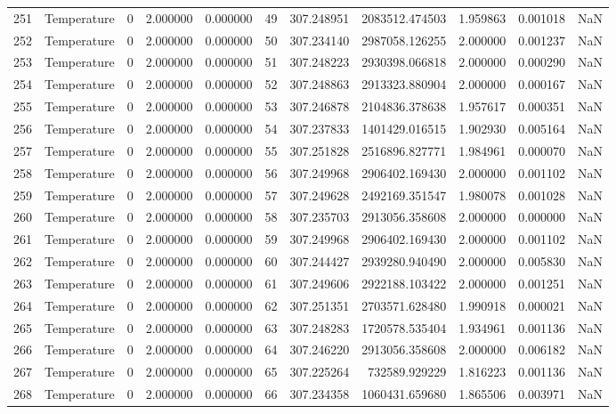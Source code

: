 \begin{tabular}{llrrrrrrrrr}
251 & Temperature & 0 & 2.000000 & 0.000000 & 49 & 307.248951 & 2083512.474503 & 1.959863 & 0.001018 & NaN \\
252 & Temperature & 0 & 2.000000 & 0.000000 & 50 & 307.234140 & 2987058.126255 & 2.000000 & 0.001237 & NaN \\
253 & Temperature & 0 & 2.000000 & 0.000000 & 51 & 307.248223 & 2930398.066818 & 2.000000 & 0.000290 & NaN \\
254 & Temperature & 0 & 2.000000 & 0.000000 & 52 & 307.248863 & 2913323.880904 & 2.000000 & 0.000167 & NaN \\
255 & Temperature & 0 & 2.000000 & 0.000000 & 53 & 307.246878 & 2104836.378638 & 1.957617 & 0.000351 & NaN \\
256 & Temperature & 0 & 2.000000 & 0.000000 & 54 & 307.237833 & 1401429.016515 & 1.902930 & 0.005164 & NaN \\
257 & Temperature & 0 & 2.000000 & 0.000000 & 55 & 307.251828 & 2516896.827771 & 1.984961 & 0.000070 & NaN \\
258 & Temperature & 0 & 2.000000 & 0.000000 & 56 & 307.249968 & 2906402.169430 & 2.000000 & 0.001102 & NaN \\
259 & Temperature & 0 & 2.000000 & 0.000000 & 57 & 307.249628 & 2492169.351547 & 1.980078 & 0.001028 & NaN \\
260 & Temperature & 0 & 2.000000 & 0.000000 & 58 & 307.235703 & 2913056.358608 & 2.000000 & 0.000000 & NaN \\
261 & Temperature & 0 & 2.000000 & 0.000000 & 59 & 307.249968 & 2906402.169430 & 2.000000 & 0.001102 & NaN \\
262 & Temperature & 0 & 2.000000 & 0.000000 & 60 & 307.244427 & 2939280.940490 & 2.000000 & 0.005830 & NaN \\
263 & Temperature & 0 & 2.000000 & 0.000000 & 61 & 307.249606 & 2922188.103422 & 2.000000 & 0.001251 & NaN \\
264 & Temperature & 0 & 2.000000 & 0.000000 & 62 & 307.251351 & 2703571.628480 & 1.990918 & 0.000021 & NaN \\
265 & Temperature & 0 & 2.000000 & 0.000000 & 63 & 307.248283 & 1720578.535404 & 1.934961 & 0.001136 & NaN \\
266 & Temperature & 0 & 2.000000 & 0.000000 & 64 & 307.246220 & 2913056.358608 & 2.000000 & 0.006182 & NaN \\
267 & Temperature & 0 & 2.000000 & 0.000000 & 65 & 307.225264 & 732589.929229 & 1.816223 & 0.001136 & NaN \\
268 & Temperature & 0 & 2.000000 & 0.000000 & 66 & 307.234358 & 1060431.659680 & 1.865506 & 0.003971 & NaN \\

\end{tabular}
